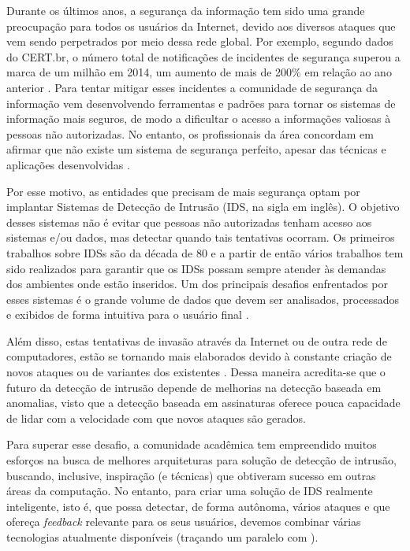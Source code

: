 \documentclass[
	12pt,				%
	openright,			%
	twoside,			%
	a4paper,			%
	english,			%
	french,				%
	spanish,			%
	brazil,				%
	]{abntex2}
\begin{document}
Durante os últimos anos, a segurança da informação tem sido uma grande preocupação para todos os usuários da Internet, devido aos diversos ataques que vem sendo perpetrados por meio dessa rede global. Por exemplo, segundo dados do CERT.br, o número total de notificações de incidentes de segurança superou a marca de um milhão em 2014, um aumento de mais de 200\% em relação ao ano anterior \cite{incidentes2015incidentes}. Para tentar mitigar esses incidentes a comunidade de segurança da informação vem desenvolvendo ferramentas e padrões para tornar os sistemas de informação mais seguros, de modo a dificultar o acesso a informações valiosas à pessoas não autorizadas. No entanto, os profissionais da área concordam em afirmar que não existe um sistema de segurança perfeito, apesar das técnicas e aplicações desenvolvidas \cite{dua2011data}.

Por esse motivo, as entidades que precisam de mais segurança optam por implantar Sistemas de Detecção de Intrusão (IDS, na sigla em inglês). O objetivo desses sistemas não é evitar que pessoas não autorizadas tenham acesso aos sistemas e/ou dados, mas detectar quando tais tentativas ocorram. Os primeiros trabalhos sobre IDSs são da década de 80 \cite{anderson1980computer, denning1987intrusion} e a partir de então vários trabalhos tem sido realizados para garantir que os IDSs possam sempre atender às demandas dos ambientes onde estão inseridos. Um dos principais desafios enfrentados por esses sistemas é o grande volume de dados que devem ser analisados, processados e exibidos de forma intuitiva para o usuário final \cite{big2013big, nassar2013secure}.

Além disso, estas tentativas de invasão através da Internet ou de outra rede de computadores, estão se tornando mais elaborados devido à constante criação de novos ataques ou de variantes dos existentes \cite{zuech2015intrusion}. Dessa maneira acredita-se que o futuro da detecção de intrusão depende de melhorias na detecção baseada em anomalias, visto que a detecção baseada em assinaturas oferece pouca capacidade de lidar com a velocidade com que novos ataques são gerados.

Para superar esse desafio, a comunidade acadêmica tem empreendido muitos esforços na busca de melhores arquiteturas para solução de detecção de intrusão, buscando, inclusive, inspiração (e técnicas) que obtiveram sucesso em outras áreas da computação. No entanto, para criar uma solução de IDS realmente inteligente, isto é, que possa detectar, de forma autônoma, vários ataques e que ofereça \emph{feedback} relevante para os seus usuários, devemos combinar várias tecnologias atualmente disponíveis (traçando um paralelo com \cite{schales2011stream}).
\end{document}

